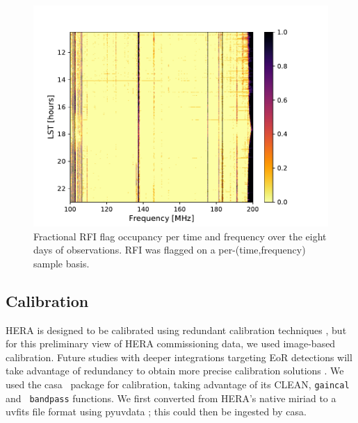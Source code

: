 \documentclass[twocolumn, trackchanges]{aastex61}
\newcommand{\casa}{{\sc casa}}
\begin{document}
\begin{figure}
\centering
\includegraphics[scale=0.6]{frac_occ.pdf}
\caption{Fractional RFI flag occupancy per time and frequency over the eight
  days of observations. RFI was flagged on a per-(time,frequency) sample basis.}
\label{fig:rfi}
\end{figure}

\subsection{Calibration}
\label{subsec:cal}

HERA is designed to be calibrated using redundant calibration techniques
\citep{DillonParsons16}, but for this preliminary view of HERA commissioning
data, we used image-based calibration. Future studies with deeper integrations
targeting EoR detections will take advantage of redundancy to obtain more
precise calibration solutions \citep{deBoer17}. We used the \casa\ \citep{casa}
package for calibration, taking advantage of its CLEAN, {\tt gaincal} and {\tt
  bandpass} functions.  We first converted from HERA's native {\sc miriad} to a
{\sc uvfits} file format using {\sc pyuvdata} \citep{pyuvdata}; this could then
be ingested by \casa.
\end{document}
